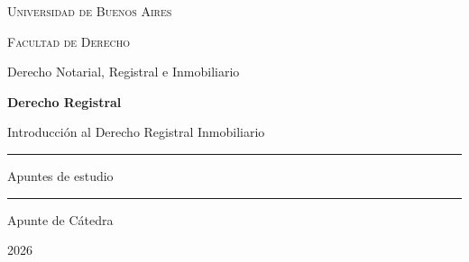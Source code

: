 \documentclass[12pt,oneside]{book}
\newcommand{\universidad}{Universidad de Buenos Aires}
\newcommand{\facultad}{Facultad de Derecho}
\newcommand{\departamento}{Derecho Notarial, Registral e Inmobiliario}
\newcommand{\materia}{Derecho Registral}
\newcommand{\titulo}{Introducción al Derecho Registral Inmobiliario}
\newcommand{\autor}{Apunte de Cátedra}
\newcommand{\anio}{2026}
\begin{document}

\begin{titlepage}

\thispagestyle{empty}

\begin{center}

\vspace*{1cm}

{\large \textsc{\universidad}}

\vspace{0.2cm}

{\large \textsc{\facultad}}

\vspace{0.2cm}

{\large \departamento}

\vspace{3cm}

{\Huge \textbf{\materia}}

\vspace{1cm}

{\LARGE \titulo}

\vspace{1.5cm}

\rule{0.70\textwidth}{0.5pt}

\vspace{0.5cm}

{\large Apuntes de estudio}

\vspace{0.5cm}

\rule{0.70\textwidth}{0.5pt}

\vfill

{\large \autor}

\vspace{0.3cm}

{\large \anio}

\end{center}

\end{titlepage}


\tableofcontents

\clearpage

\end{document}
